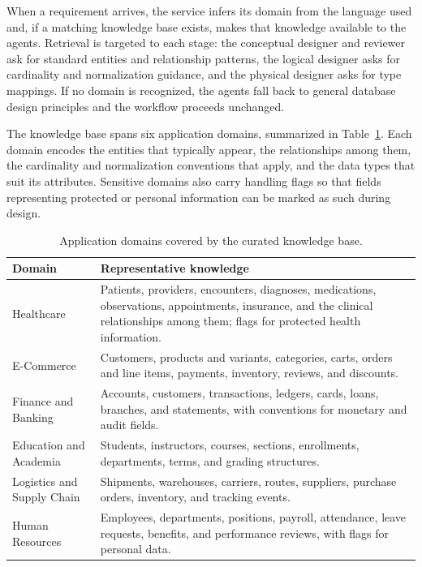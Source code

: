 When a requirement arrives, the service infers its domain from the language used and, if a matching knowledge base exists, makes that knowledge available to the agents. Retrieval is targeted to each stage: the conceptual designer and reviewer ask for standard entities and relationship patterns, the logical designer asks for cardinality and normalization guidance, and the physical designer asks for type mappings. If no domain is recognized, the agents fall back to general database design principles and the workflow proceeds unchanged.

The knowledge base spans six application domains, summarized in Table~\ref{tab:rag_domains}. Each domain encodes the entities that typically appear, the relationships among them, the cardinality and normalization conventions that apply, and the data types that suit its attributes. Sensitive domains also carry handling flags so that fields representing protected or personal information can be marked as such during design.

\begin{table}[H]
    \centering
    \small
    \renewcommand{\arraystretch}{1.3}
    \begin{tabularx}{\textwidth}{|>{\RaggedRight\arraybackslash}p{3.2cm}|>{\RaggedRight\arraybackslash}X|}
    \hline
    \textbf{Domain} & \textbf{Representative knowledge} \\
    \hline
    Healthcare & Patients, providers, encounters, diagnoses, medications, observations, appointments, insurance, and the clinical relationships among them; flags for protected health information. \\
    \hline
    E-Commerce & Customers, products and variants, categories, carts, orders and line items, payments, inventory, reviews, and discounts. \\
    \hline
    Finance and Banking & Accounts, customers, transactions, ledgers, cards, loans, branches, and statements, with conventions for monetary and audit fields. \\
    \hline
    Education and Academia & Students, instructors, courses, sections, enrollments, departments, terms, and grading structures. \\
    \hline
    Logistics and Supply Chain & Shipments, warehouses, carriers, routes, suppliers, purchase orders, inventory, and tracking events. \\
    \hline
    Human Resources & Employees, departments, positions, payroll, attendance, leave requests, benefits, and performance reviews, with flags for personal data. \\
    \hline
    \end{tabularx}
    \caption{Application domains covered by the curated knowledge base.}
    \label{tab:rag_domains}
\end{table}

